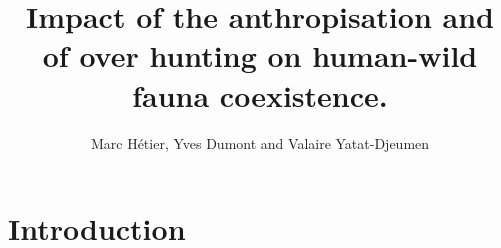\documentclass{article}
\title{Impact of the anthropisation and of over hunting on human-wild fauna coexistence.}
\author{Marc Hétier, Yves Dumont  and Valaire Yatat-Djeumen}
\newcommand{\marc}[1]{\textcolor{teal}{#1}}
\newcommand{\YD}[1]{\textcolor{magenta}{#1}}
\begin{document}
\maketitle

\section{Introduction}

%

\end{document}

